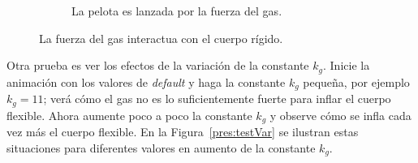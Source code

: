 \begin{figure}
\begin{subfigure}[b]{0.45\textwidth}
    \caption{La pelota es lanzada por la fuerza del gas.}
    \label{pres:test4}
  \end{subfigure}
 \caption[Experimento: Fuerza del gas - cuerpo rígido]{La fuerza del gas interactua con el cuerpo rígido.} 
 \label{pres:test}
\end{figure}

Otra prueba es ver los efectos de la variación de la constante $k_g$.
Inicie la animación con los valores de \emph{\textenglish{default}} y haga la constante $k_g$ pequeña, por ejemplo $k_g =11$; verá cómo el gas no es lo suficientemente fuerte para inflar el cuerpo flexible.
Ahora aumente poco a poco la constante $k_g$ y observe cómo se infla cada vez más el cuerpo flexible.
En la Figura~\ref{pres:testVar} se ilustran estas situaciones para diferentes valores en aumento de la constante $k_g$.


